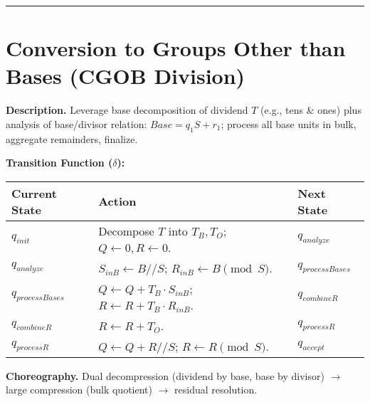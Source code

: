 \documentclass[
]{article}
\begin{document}
\begin{center}\rule{0.5\linewidth}{0.5pt}\end{center}

\section{Conversion to Groups Other than Bases (CGOB
Division)}\label{conversion-to-groups-other-than-bases-cgob-division}

\textbf{Description.} Leverage base decomposition of dividend \(T\)
(e.g., tens \& ones) plus analysis of base/divisor relation:
\(Base = q_1 S + r_1\); process all base units in bulk, aggregate
remainders, finalize.

\textbf{Transition Function (\(\delta\)):}

\begin{longtable}[]{@{}
  >{\raggedright\arraybackslash}p{}
  >{\raggedright\arraybackslash}p{}
  >{\raggedright\arraybackslash}p{}@{}}
\toprule\noalign{}
\begin{minipage}[b]{\linewidth}\raggedright
Current State
\end{minipage} & \begin{minipage}[b]{\linewidth}\raggedright
Action
\end{minipage} & \begin{minipage}[b]{\linewidth}\raggedright
Next State
\end{minipage} \\
\midrule\noalign{}
\endhead
\bottomrule\noalign{}
\endlastfoot
\(q_{init}\) & Decompose \(T\) into \(T_B, T_O\);
\(Q \leftarrow 0, R \leftarrow 0\). & \(q_{analyze}\) \\
\(q_{analyze}\) & \(S_{inB} \leftarrow B // S\);
\(R_{inB} \leftarrow B \pmod S\). & \(q_{processBases}\) \\
\(q_{processBases}\) & \(Q \leftarrow Q + T_B \cdot S_{inB}\);
\(R \leftarrow R + T_B \cdot R_{inB}\). & \(q_{combineR}\) \\
\(q_{combineR}\) & \(R \leftarrow R + T_O\). & \(q_{processR}\) \\
\(q_{processR}\) & \(Q \leftarrow Q + R // S\);
\(R \leftarrow R \pmod S\). & \(q_{accept}\) \\
\end{longtable}

\textbf{Choreography.} Dual decompression (dividend by base, base by
divisor) \(\to\) large compression (bulk quotient) \(\to\) residual
resolution.
\end{document}
